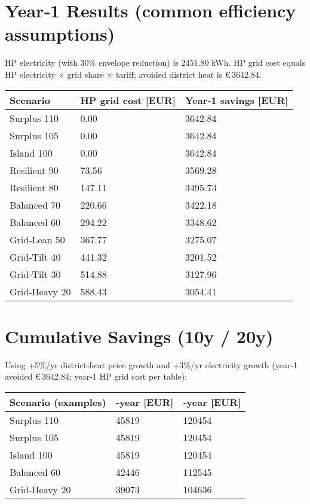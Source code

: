 \documentclass[11pt,oneside]{report}
\begin{document}
\section{Year‑1 Results (common efficiency assumptions)}
HP electricity (with 30\% envelope reduction) is \num{2451.80} kWh. HP grid cost equals HP electricity \(\times\) grid share \(\times\) tariff; avoided district heat is \euro\,\num{3642.84}.

\begin{tabularx}{\textwidth}{@{}l>{\raggedleft\arraybackslash}X>{\raggedleft\arraybackslash}X@{}}
\toprule
Scenario & HP grid cost [EUR] & Year‑1 savings [EUR] \\
\midrule
Surplus 110 & \num{0.00}   & \num{3642.84} \\
Surplus 105 & \num{0.00}   & \num{3642.84} \\
Island 100 & \num{0.00}   & \num{3642.84} \\
Resilient 90 & \num{73.56}  & \num{3569.28} \\
Resilient 80 & \num{147.11} & \num{3495.73} \\
Balanced 70 & \num{220.66} & \num{3422.18} \\
Balanced 60 & \num{294.22} & \num{3348.62} \\
Grid‑Lean 50 & \num{367.77} & \num{3275.07} \\
Grid‑Tilt 40 & \num{441.32} & \num{3201.52} \\
Grid‑Tilt 30 & \num{514.88} & \num{3127.96} \\
Grid‑Heavy 20 & \num{588.43} & \num{3054.41} \\
\bottomrule
\end{tabularx}

\section{Cumulative Savings (10y / 20y)}
Using +5\%/yr district‑heat price growth and +3\%/yr electricity growth (year‑1 avoided \euro\,\num{3642.84}; year‑1 HP grid cost per table):

\begin{tabularx}{\textwidth}{@{}l>{\raggedleft\arraybackslash}X>{\raggedleft\arraybackslash}X@{}}
\toprule
Scenario (examples) & 10‑year [EUR] & 20‑year [EUR] \\
\midrule
Surplus 110  & \num{45819} & \num{120454} \\
Surplus 105  & \num{45819} & \num{120454} \\
Island 100  & \num{45819} & \num{120454} \\
Balanced 60 & \num{42446} & \num{112545} \\
Grid‑Heavy 20 & \num{39073} & \num{104636} \\
\bottomrule
\end{tabularx}
\end{document}
